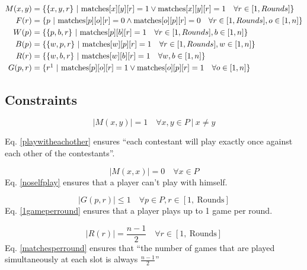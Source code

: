 \documentclass[a4paper, 10pt]{article}
\begin{document}
\begin{align*}
    M(x, y)   &= \{ \{x, y, r\} \ | \ \text{matches}[x][y][r] = 1 \lor \text{matches}[x][y][r] = 1 \quad \forall r \in [1, Rounds]\}\\
    F(r)      &= \{ p \ | \ \text{matches}[p][o][r] = 0 \land \text{matches}[o][p][r] = 0 \quad \forall r \in [1, Rounds], o \in [1, n]\}\\
    W(p)      &= \{ \{p, b, r\} \ | \ \text{matches}[p][b][r] = 1  \quad \forall r \in [1, Rounds], b \in [1, n]\}\\
    B(p)      &= \{ \{w, p, r\} \ | \ \text{matches}[w][p][r] = 1  \quad \forall r \in [1, Rounds], w \in [1, n]\}\\
    R(r)      &= \{ \{w, b, r\} \ | \ \text{matches}[w][b][r] = 1  \quad \forall w, b \in [1, n]\}\\
    G(p, r)   &= \{ r\footnotemark \ | \ \text{matches}[p][o][r] = 1  \lor \text{matches}[o][p][r] = 1 \quad \forall o \in [1, n]\}\\
\end{align*}

\subsection{Constraints}

\begin{equation}
    \label{playwitheachother}
    |M(x,y)| = 1 \quad \forall x,y \in P \ | \  x \neq y
\end{equation}

Eq. \ref{playwitheachother} ensures ``each contestant will play exactly once against each other of the contestants''.

\begin{equation}
    \label{noselfplay}
    |M(x,x)| = 0 \quad \forall x \in P 
\end{equation}
Eq. \ref{noselfplay} ensures that a player can't play with himself. 

\begin{equation}
    \label{1gameperround}
    |G(p,r)| \leq 1 \quad \forall p \in P, r \in [1, \ \text{Rounds}] 
\end{equation}
Eq. \ref{1gameperround} ensures that a player plays up to 1 game per round.

\begin{equation}
    \label{matchesperround}
    |R(r)| = \frac{n-1}{2}  \quad \forall r \in [1,\ \text{Rounds}] 
\end{equation}
Eq. \ref{matchesperround} ensures that ``the number of games that are played simultaneously at each slot is always $\frac{n-1}{2}$''
\end{document}
